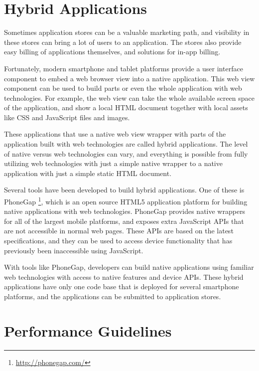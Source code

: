 \section{Hybrid Applications}

Sometimes application stores can be a valuable marketing path, and
visibility in these stores can bring a lot of users to an
application. The stores also provide easy billing of applications
themselves, and solutions for in-app
billing. \cite{cortimiglia2011mobile}

Fortunately, modern smartphone and tablet platforms provide a user
interface component to embed a web browser view into a native
application. This web view component can be used to build parts or
even the whole application with web technologies. For example, the web
view can take the whole available screen space of the application, and
show a local HTML document together with local assets like CSS and
JavaScript files and images.

These applications that use a native web view wrapper with parts of
the application built with web technologies are called hybrid
applications. The level of native versus web technologies can vary,
and everything is possible from fully utilizing web technologies with
just a simple native wrapper to a native application with just a
simple static HTML document.

Several tools have been developed to build hybrid applications. One of
these is PhoneGap \footnote{\url{http://phonegap.com/}}, which is an
open source HTML5 application platform for building native
applications with web technologies. PhoneGap provides native wrappers
for all of the largest mobile platforms, and exposes extra JavaScript
APIs that are not accessible in normal web pages. These APIs are based
on the latest specifications, and they can be used to access device
functionality that has previously been inaccessible using JavaScript.

With tools like PhoneGap, developers can build native applications
using familiar web technologies with access to native features and
device APIs. These hybrid applications have only one code base that is
deployed for several smartphone platforms, and the applications can be
submitted to application stores.

\clearpage
\section{Performance Guidelines}
\label{section:performance-guidelines}

